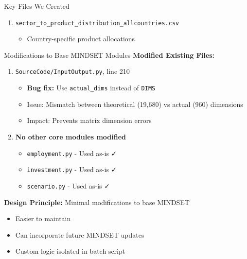 \documentclass[10pt]{beamer}
\begin{document}
\begin{frame}[fragile]{Key Files We Created}
\begin{enumerate}
    \item \texttt{sector\_to\_product\_distribution\_allcountries.csv}
    \begin{itemize}
        \item Country-specific product allocations
    \end{itemize}
\end{enumerate}

\end{frame}


\begin{frame}{Modifications to Base MINDSET Modules}
\textbf{Modified Existing Files:}

\vspace{0.3cm}

\begin{enumerate}
    \item \texttt{SourceCode/InputOutput.py}, line 210
    \begin{itemize}
        \item \textbf{Bug fix:} Use \texttt{actual\_dims} instead of \texttt{DIMS}
        \item Issue: Mismatch between theoretical (19,680) vs actual (960) dimensions
        \item Impact: Prevents matrix dimension errors
    \end{itemize}

    \vspace{0.3cm}

    \item \textbf{No other core modules modified}
    \begin{itemize}
        \item \texttt{employment.py} - Used as-is ✓
        \item \texttt{investment.py} - Used as-is ✓
        \item \texttt{scenario.py} - Used as-is ✓
    \end{itemize}
\end{enumerate}

\vspace{0.5cm}

\textbf{Design Principle:} Minimal modifications to base MINDSET
\begin{itemize}
    \item Easier to maintain
    \item Can incorporate future MINDSET updates
    \item Custom logic isolated in batch script
\end{itemize}

\end{frame}
\end{document}
